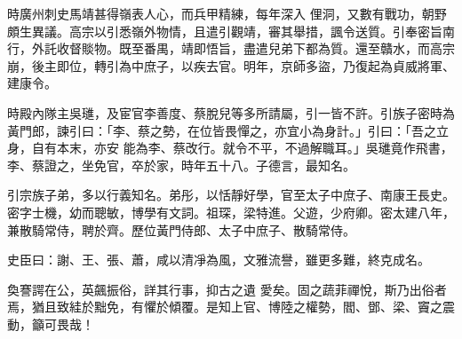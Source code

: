 \begin{pinyinscope}
 時廣州刺史馬靖甚得嶺表人心，而兵甲精練，每年深入
 俚洞，又數有戰功，朝野頗生異議。高宗以引悉嶺外物情，且遣引觀靖，審其舉措，諷令送質。引奉密旨南行，外託收督賧物。既至番禺，靖即悟旨，盡遣兒弟下都為質。還至贛水，而高宗崩，後主即位，轉引為中庶子，以疾去官。明年，京師多盜，乃復起為貞威將軍、建康令。



 時殿內隊主吳璡，及宦官李善度、蔡脫兒等多所請屬，引一皆不許。引族子密時為黃門郎，諫引曰：「李、蔡之勢，在位皆畏憚之，亦宜小為身計。」引曰：「吾之立身，自有本末，亦安
 能為李、蔡改行。就令不平，不過解職耳。」吳璡竟作飛書，李、蔡證之，坐免官，卒於家，時年五十八。子德言，最知名。



 引宗族子弟，多以行義知名。弟彤，以恬靜好學，官至太子中庶子、南康王長史。密字士機，幼而聰敏，博學有文詞。祖琛，梁特進。父遊，少府卿。密太建八年，兼散騎常侍，聘於齊。歷位黃門侍郎、太子中庶子、散騎常侍。



 史臣曰：謝、王、張、蕭，咸以清凈為風，文雅流譽，雖更多難，終克成名。



 奐謇諤在公，英飆振俗，詳其行事，抑古之遺
 愛矣。固之蔬菲禪悅，斯乃出俗者焉，猶且致絓於黜免，有懼於傾覆。是知上官、博陸之權勢，閻、鄧、梁、竇之震動，籲可畏哉！



\end{pinyinscope}
